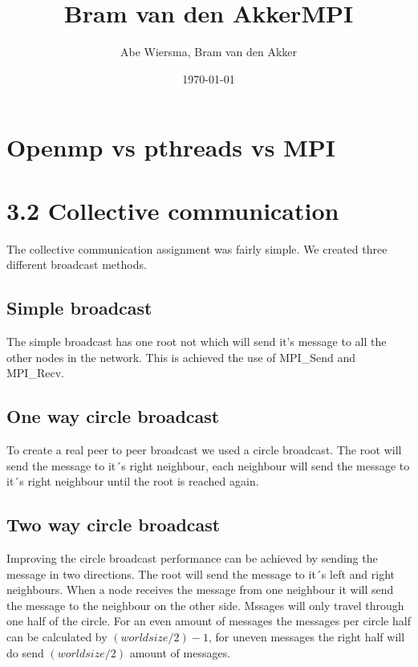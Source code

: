 \documentclass[10pt]{article}
\title{\bfseries\Huge Bram van den Akker}
\date{}
\begin{document}
\title{MPI}
\author{Abe Wiersma, Bram van den Akker}
\date{\today}
\maketitle
\newpage

\section{Openmp vs pthreads vs MPI}


\section{3.2 Collective communication}
The collective communication assignment was fairly simple. We created three different broadcast methods. 

\subsection{Simple broadcast}
The simple broadcast has one root not which will send it's message to all the other nodes in the network. This is achieved the use of MPI\_Send and MPI\_Recv.
\subsection{One way circle broadcast}
To create a real peer to peer broadcast we used a circle broadcast. The root will send the message to it´s right neighbour, each neighbour will send the message to it´s right neighbour until the root is reached again. 
\subsection{Two way circle broadcast}
Improving the circle broadcast performance can be achieved by sending the message in two directions. The root will send the message to it´s left and right neighbours. When a node receives the message from one neighbour it will send the message to the neighbour on the other side. Mssages will only travel through one half of the circle. For an even amount of messages the messages per circle half can be calculated by $(world size / 2) - 1$, for uneven messages the right half will do send $(world size / 2)$ amount of messages.
\end{document}
